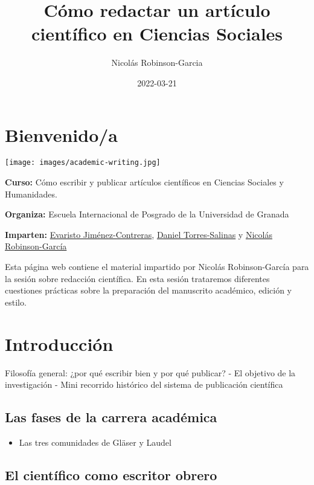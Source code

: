 \documentclass[
]{book}
\title{Cómo redactar un artículo científico en Ciencias Sociales}
\author{Nicolás Robinson-Garcia}
\date{2022-03-21}
\providecommand{\tightlist}{%
  \setlength{\itemsep}{0pt}\setlength{\parskip}{0pt}}
\begin{document}
\maketitle

{
\setcounter{tocdepth}{1}
\tableofcontents
}
\hypertarget{bienvenidoa}{%
\chapter*{Bienvenido/a}\label{bienvenidoa}}

\texttt{[image: images/academic-writing.jpg]}

\textbf{Curso:} Cómo escribir y publicar artículos científicos en Ciencias Sociales y Humanidades.

\textbf{Organiza:} Escuela Internacional de Posgrado de la Universidad de Granada

\textbf{Imparten:} \href{https://www.ugr.es/en/staff/evaristo-jimenez-contreras}{Evaristo Jiménez-Contreras}, \href{https://sites.google.com/go.ugr.es/torressalinas}{Daniel Torres-Salinas} y \href{https://nrobinsongarcia.com}{Nicolás Robinson-García}

Esta página web contiene el material impartido por Nicolás Robinson-García para la sesión sobre redacción científica. En esta sesión trataremos diferentes cuestiones prácticas sobre la preparación del manuscrito académico, edición y estilo.

\hypertarget{intro}{%
\chapter{Introducción}\label{intro}}

Filosofía general: ¿por qué escribir bien y por qué publicar?
- El objetivo de la investigación
- Mini recorrido histórico del sistema de publicación científica

\hypertarget{las-fases-de-la-carrera-acaduxe9mica}{%
\section{Las fases de la carrera académica}\label{las-fases-de-la-carrera-acaduxe9mica}}

\begin{itemize}
\tightlist
\item
  Las tres comunidades de Gläser y Laudel
\end{itemize}

\hypertarget{el-cientuxedfico-como-escritor-obrero}{%
\section{El científico como escritor obrero}\label{el-cientuxedfico-como-escritor-obrero}}
\end{document}
